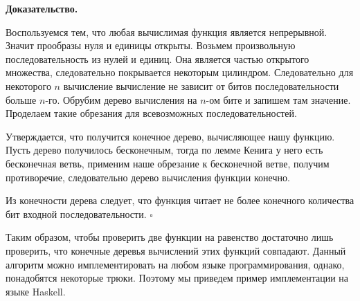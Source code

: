\documentclass{article}
\renewenvironment{proof}{\par\noindent%
{\bf Доказательство.\par\nopagebreak}}{\unskip\nobreak\enskip$\square$\par\bigskip}
\begin{document}
\begin{proof}
Воспользуемся тем, что любая вычислимая функция является непрерывной.
Значит прообразы нуля и единицы открыты. Возьмем произвольную последовательность
из нулей и единиц. Она является частью открытого множества, следовательно покрывается
некоторым цилиндром. Следовательно для некоторого $n$ вычисление вычисление
не зависит от битов последовательности больше $n$-го. Обрубим дерево вычисления на $n$-ом
бите и запишем там значение. Проделаем такие обрезания для всевозможных последовательностей.

Утверждается, что получится конечное дерево, вычисляющее нашу функцию.
Пусть дерево получилось бесконечным, тогда по лемме Кенига у него есть бесконечная ветвь,
применим наше обрезание к бесконечной ветве, получим противоречие, следовательно
дерево вычисления функции конечно.

Из конечности дерева следует, что функция читает не более конечного количества
бит входной последовательности.
\end{proof}

Таким образом, чтобы проверить две функции на равенство достаточно лишь проверить, что
конечные деревья вычислений этих функций совпадают. Данный алгоритм можно имплементировать
на любом языке программирования, однако, понадобятся некоторые трюки. Поэтому
мы приведем пример имплементации на языке Haskell.



%
\end{document}
